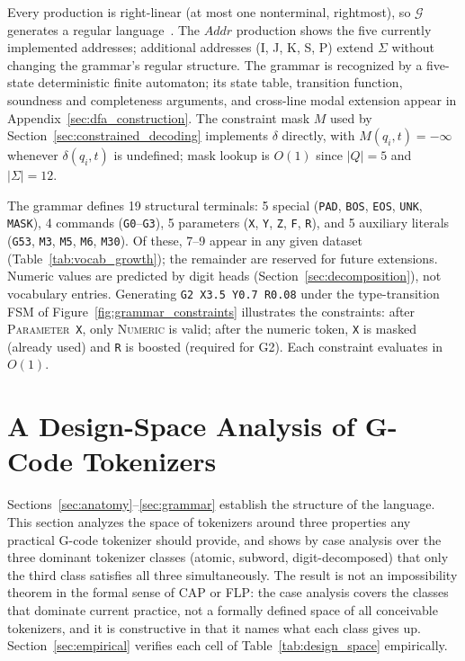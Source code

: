 \documentclass[sensors,article,submit,moreauthors,pdftex]{Definitions/mdpi}
\begin{document}
\noindent Every production is right-linear (at most one nonterminal, rightmost), so $\mathcal{G}$ generates a regular language~\cite{sipser}. The $\mathit{Addr}$ production shows the five currently implemented addresses; additional addresses (I, J, K, S, P) extend $\Sigma$ without changing the grammar's regular structure. The grammar is recognized by a five-state deterministic finite automaton; its state table, transition function, soundness and completeness arguments, and cross-line modal extension appear in Appendix~\ref{sec:dfa_construction}. The constraint mask $M$ used by Section~\ref{sec:constrained_decoding} implements $\delta$ directly, with $M(q_i, t) = -\infty$ whenever $\delta(q_i, t)$ is undefined; mask lookup is $O(1)$ since $|Q| = 5$ and $|\Sigma| = 12$.

The grammar defines 19 structural terminals: 5 special (\texttt{PAD}, \texttt{BOS}, \texttt{EOS}, \texttt{UNK}, \texttt{MASK}), 4 commands (\texttt{G0}--\texttt{G3}), 5 parameters (\texttt{X}, \texttt{Y}, \texttt{Z}, \texttt{F}, \texttt{R}), and 5 auxiliary literals (\texttt{G53}, \texttt{M3}, \texttt{M5}, \texttt{M6}, \texttt{M30}). Of these, 7--9 appear in any given dataset (Table~\ref{tab:vocab_growth}); the remainder are reserved for future extensions. Numeric values are predicted by digit heads (Section~\ref{sec:decomposition}), not vocabulary entries. Generating \texttt{G2 X3.5 Y0.7 R0.08} under the type-transition FSM of Figure~\ref{fig:grammar_constraints} illustrates the constraints: after \textsc{Parameter}~\texttt{X}, only \textsc{Numeric} is valid; after the numeric token, \texttt{X} is masked (already used) and \texttt{R} is boosted (required for G2). Each constraint evaluates in $O(1)$.

\section{A Design-Space Analysis of G-Code Tokenizers}
\label{sec:design_space}

Sections~\ref{sec:anatomy}--\ref{sec:grammar} establish the structure of the language. This section analyzes the space of tokenizers around three properties any practical G-code tokenizer should provide, and shows by case analysis over the three dominant tokenizer classes (atomic, subword, digit-decomposed) that only the third class satisfies all three simultaneously. The result is not an impossibility theorem in the formal sense of CAP or FLP: the case analysis covers the classes that dominate current practice, not a formally defined space of all conceivable tokenizers, and it is constructive in that it names what each class gives up. Section~\ref{sec:empirical} verifies each cell of Table~\ref{tab:design_space} empirically.
\end{document}
